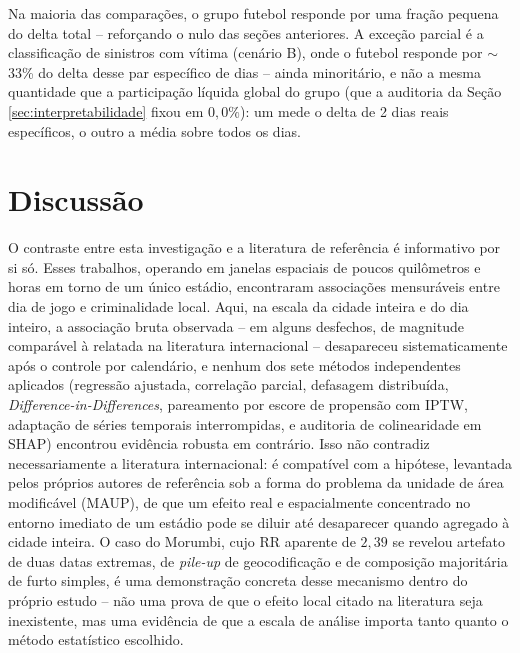 \documentclass[12pt]{article}
\begin{document}
Na maioria das comparações, o grupo futebol responde por uma fração
pequena do delta total -- reforçando o nulo das seções anteriores. A
exceção parcial é a classificação de sinistros com vítima (cenário B),
onde o futebol responde por $\sim$33\% do delta desse par específico de
dias -- ainda minoritário, e não a mesma quantidade que a participação
líquida global do grupo (que a auditoria da Seção
\ref{sec:interpretabilidade} fixou em $0,0\%$): um mede o delta de 2 dias
reais específicos, o outro a média sobre todos os dias.

\section{Discussão}

O contraste entre esta investigação e a literatura de referência
\cite{kurland2014,ristea2018,ristea2020} é informativo por si só. Esses
trabalhos, operando em janelas espaciais de poucos quilômetros e horas em
torno de um único estádio, encontraram associações mensuráveis entre dia
de jogo e criminalidade local. Aqui, na escala da cidade inteira e do dia
inteiro, a associação bruta observada -- em alguns desfechos, de
magnitude comparável à relatada na literatura internacional --
desapareceu sistematicamente após o controle por calendário, e nenhum
dos sete métodos independentes aplicados (regressão ajustada, correlação
parcial, defasagem distribuída, \emph{Difference-in-Differences},
pareamento por escore de propensão com IPTW, adaptação de séries
temporais interrompidas, e auditoria de colinearidade em SHAP) encontrou
evidência robusta em contrário. Isso não contradiz necessariamente a
literatura internacional: é compatível com a hipótese, levantada pelos
próprios autores de referência sob a forma do problema da unidade de
área modificável (MAUP), de que um efeito real e espacialmente
concentrado no entorno imediato de um estádio pode se diluir até
desaparecer quando agregado à cidade inteira. O caso do Morumbi, cujo RR
aparente de $2,39$ se revelou artefato de duas datas extremas, de
\emph{pile-up} de geocodificação e de composição majoritária de furto
simples, é uma demonstração concreta desse mecanismo dentro do próprio
estudo -- não uma prova de que o efeito local citado na literatura seja
inexistente, mas uma evidência de que a escala de análise importa tanto
quanto o método estatístico escolhido.
\end{document}

